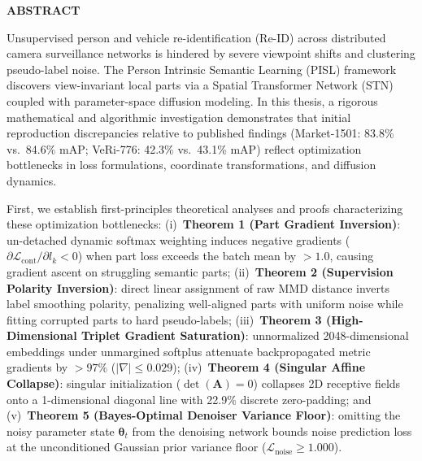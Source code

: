 \thispagestyle{plain}
\begin{center}
    \vspace*{-1.0em}
    {\large \textbf{ABSTRACT}}
\end{center}
\vspace{-1.0em}

\begingroup
\small
\noindent
Unsupervised person and vehicle re-identification (Re-ID) across distributed camera surveillance networks is hindered by severe viewpoint shifts and clustering pseudo-label noise. The Person Intrinsic Semantic Learning (PISL) framework discovers view-invariant local parts via a Spatial Transformer Network (STN) coupled with parameter-space diffusion modeling. In this thesis, a rigorous mathematical and algorithmic investigation demonstrates that initial reproduction discrepancies relative to published findings (Market-1501: 83.8\% vs.\ 84.6\% mAP; VeRi-776: 42.3\% vs.\ 43.1\% mAP) reflect optimization bottlenecks in loss formulations, coordinate transformations, and diffusion dynamics.

First, we establish first-principles theoretical analyses and proofs characterizing these optimization bottlenecks:
(i)~\textbf{Theorem 1 (Part Gradient Inversion)}: un-detached dynamic softmax weighting induces negative gradients ($\partial \mathcal{L}_{\text{cont}} / \partial l_k < 0$) when part loss exceeds the batch mean by $>1.0$, causing gradient ascent on struggling semantic parts;
(ii)~\textbf{Theorem 2 (Supervision Polarity Inversion)}: direct linear assignment of raw MMD distance inverts label smoothing polarity, penalizing well-aligned parts with uniform noise while fitting corrupted parts to hard pseudo-labels;
(iii)~\textbf{Theorem 3 (High-Dimensional Triplet Gradient Saturation)}: unnormalized 2048-dimensional embeddings under unmargined softplus attenuate backpropagated metric gradients by $>97\%$ ($|\nabla| \le 0.029$);
(iv)~\textbf{Theorem 4 (Singular Affine Collapse)}: singular initialization ($\det(\mathbf{A}) = 0$) collapses 2D receptive fields onto a 1-dimensional diagonal line with 22.9\% discrete zero-padding; and
(v)~\textbf{Theorem 5 (Bayes-Optimal Denoiser Variance Floor)}: omitting the noisy parameter state $\boldsymbol{\theta}_t$ from the denoising network bounds noise prediction loss at the unconditioned Gaussian prior variance floor ($\mathcal{L}_{\text{noise}} \ge 1.000$).

